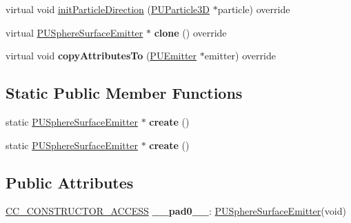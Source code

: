 \begin{DoxyCompactItemize}
virtual void \hyperlink{classPUSphereSurfaceEmitter_ae3cf2112066b7107ad740d1a70fd52ef}{init\+Particle\+Direction} (\hyperlink{structPUParticle3D}{P\+U\+Particle3D} $\ast$particle) override
\item 
\mbox{\label{classPUSphereSurfaceEmitter_a7bb4a450967056924222f06a598a2b79}} 
virtual \hyperlink{classPUSphereSurfaceEmitter}{P\+U\+Sphere\+Surface\+Emitter} $\ast$ {\bfseries clone} () override
\item 
\mbox{\label{classPUSphereSurfaceEmitter_afa3b659d522a66cae5647d9e128006e2}} 
virtual void {\bfseries copy\+Attributes\+To} (\hyperlink{classPUEmitter}{P\+U\+Emitter} $\ast$emitter) override
\end{DoxyCompactItemize}
\subsection*{Static Public Member Functions}
\begin{DoxyCompactItemize}
\item 
\mbox{\label{classPUSphereSurfaceEmitter_a9a2eaf97d6be75752f0bfa8dcfdd74f4}} 
static \hyperlink{classPUSphereSurfaceEmitter}{P\+U\+Sphere\+Surface\+Emitter} $\ast$ {\bfseries create} ()
\item 
\mbox{\label{classPUSphereSurfaceEmitter_adbb0e3296d48006b82880d3b68f23311}} 
static \hyperlink{classPUSphereSurfaceEmitter}{P\+U\+Sphere\+Surface\+Emitter} $\ast$ {\bfseries create} ()
\end{DoxyCompactItemize}
\subsection*{Public Attributes}
\begin{DoxyCompactItemize}
\item 
\mbox{\label{classPUSphereSurfaceEmitter_a9fc37aba85f3a04dcc2627f1bc221600}} 
\hyperlink{_2cocos2d_2cocos_2base_2ccConfig_8h_a25ef1314f97c35a2ed3d029b0ead6da0}{C\+C\+\_\+\+C\+O\+N\+S\+T\+R\+U\+C\+T\+O\+R\+\_\+\+A\+C\+C\+E\+SS} {\bfseries \+\_\+\+\_\+pad0\+\_\+\+\_\+}\+: \hyperlink{classPUSphereSurfaceEmitter}{P\+U\+Sphere\+Surface\+Emitter}(void)
\end{DoxyCompactItemize}
